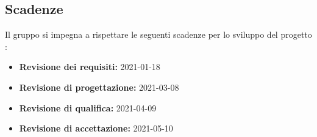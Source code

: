 \subsection{Scadenze}
\label{sub:scadenze_fissate}
Il gruppo {\Gruppo} si impegna a rispettare le seguenti scadenze per lo sviluppo del progetto \NomeProgetto:
\begin{itemize}
    \item \textbf{Revisione dei requisiti:} 2021-01-18
    \item \textbf{Revisione di progettazione:} 2021-03-08
    \item \textbf{Revisione di qualifica:} 2021-04-09
    \item \textbf{Revisione di accettazione:} 2021-05-10
\end{itemize}
